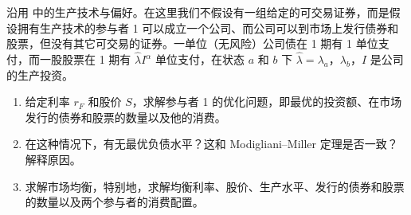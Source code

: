 \par\noindent\begin{minipage}{\linewidth}
\begin{problem}
 沿用 中的生产技术与偏好。在这里我们不假设有一组给定的可交易证券，而是假设拥有生产技术的参与者 1 可以成立一个公司、而公司可以到市场上发行债券和股票，但没有其它可交易的证券。一单位（无风险）公司债在 1 期有 1 单位支付，而一股股票在 1 期有 $\hat{\lambda}I^{\alpha}$ 单位支付，在状态 $a$ 和 $b$ 下 $\hat{\lambda}=\lambda_{a}$，$\lambda_{b}$，$I$ 是公司的生产投资。
\begin{enumerate}[label=(\alph*)]
    \item 给定利率 $r_{F}$ 和股价 $S$，求解参与者 1 的优化问题，即最优的投资额、在市场发行的债券和股票的数量以及他的消费。
    \item 在这种情况下，有无最优负债水平？这和 Modigliani--Miller 定理是否一致？解释原因。
    \item 求解市场均衡，特别地，求解均衡利率、股价、生产水平、发行的债券和股票的数量以及两个参与者的消费配置。
\end{enumerate}
\end{problem}
\end{minipage}\par
{}
